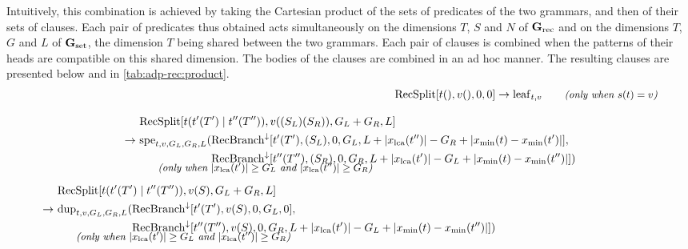 Intuitively, this combination is achieved by taking the Cartesian product of the sets of predicates of the two grammars, and then of their sets of clauses.
Each pair of predicates thus obtained acts simultaneously on the dimensions \(T\), \(S\) and \(N\) of \(\mathbf{G}_{\mathrm{rec}}\) and on the dimensions \(T\), \(G\) and \(L\) of \(\mathbf{G}_{\mathrm{set}}\), the dimension \(T\) being shared between the two grammars.
Each pair of clauses is combined when the patterns of their heads are compatible on this shared dimension.
The bodies of the clauses are combined in an ad hoc manner.
The resulting clauses are presented below and in \cref{tab:adp-rec:product}.
{\allowdisplaybreaks
\begin{subequations}
\begin{align}
    \gRecSplit[t(), v(), 0, 0] &\rightarrow \evLeaf_{t,v}
    \qquad\text{\itshape\small (only when \(\llmap(t) = v\))} \label{eq:adp-rec:comb-grammar-leaf}\\[2ex]
    \begin{aligned}
        &\gRecSplit[t(t'(T') \mid t''(T'')), v((S_L)(S_R)), G_L + G_R, L] \\
        \rightarrow\ & \evSpe_{t,v,G_L,G_R,L}(
            \begin{aligned}[t]
                &\gRecPathBranch[t'(T'), (S_L), 0, G_L, L + |\xlca(t'')| - G_R + |\xmin(t) - \xmin(t')|], \\
                &\gRecPathBranch[t''(T''), (S_R), 0, G_R, L + |\xlca(t')| - G_L + |\xmin(t) - \xmin(t'')|])
            \end{aligned} \\[-2ex]
        \intertext{\hspace*{3em}\itshape\small (only when \(|\xlca(t')| \ge G_L\) and \(|\xlca(t'')| \ge G_R\))}
    \end{aligned} \span \label{eq:adp-rec:comb-grammar-spe} \\[1ex]
    \begin{aligned}
        &\gRecSplit[t(t'(T') \mid t''(T'')), v(S), G_L + G_R, L] \\
        \rightarrow\ & \evDup_{t,v,G_L,G_R,L}(
            \begin{aligned}[t]
                &\gRecPathBranch[t'(T'), v(S), 0, G_L, 0], \\
                &\gRecPathBranch[t''(T''), v(S), 0, G_R, L + |\xlca(t')| - G_L + |\xmin(t) - \xmin(t'')|])
            \end{aligned} \\[-2ex]
        \intertext{\hspace*{3em}\itshape\small (only when \(|\xlca(t')| \ge G_L\) and \(|\xlca(t'')| \ge G_R\))}

\end{aligned}
\end{align}
\end{subequations}}
